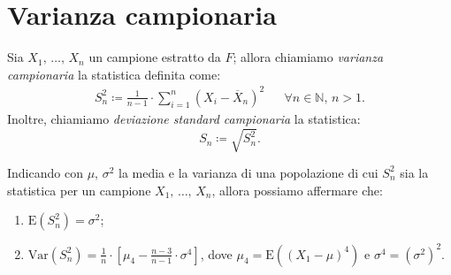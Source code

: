     \section{Varianza campionaria}
        \begin{defn}
            Sia $X_1,\, \ldots,\, X_{n}$ un campione estratto da $F$; allora chiamiamo 
            \emph{varianza campionaria} la statistica definita come:
            \begin{align}\label{eq:Varianza_campionaria}
                S_n^2 \coloneqq \frac{1}{n-1}\cdot \sum_{i=1}^{n} (X_i - \overline{X}_n)^2 
                & & \forall n \in \mathbb{N},\, n > 1
            .\end{align}
            Inoltre, chiamiamo \emph{deviazione standard campionaria} la statistica: \[
                S_n \coloneqq  \sqrt{S_n^2}
            .\]
        \end{defn}
        \begin{prty}
            Indicando con $\mu,\, \sigma^2$ la media e la varianza di una popolazione di cui $S_n^2$ 
            sia la statistica per un campione $X_1,\, \ldots,\, X_{n}$, allora possiamo affermare che:
            \begin{enumerate}
                \item $\text{E}(S_n^2) = \sigma^2$;
                \item $\text{Var}(S_n^2) = \frac{1}{n}\cdot[\mu_4 - \frac{n-3}{n-1}\cdot\sigma^4]$, dove
                    $\mu_4 = \text{E}((X_1-\mu)^4)$ e $\sigma^4 = (\sigma^2)^2$.
            \end{enumerate}
        \end{prty}

